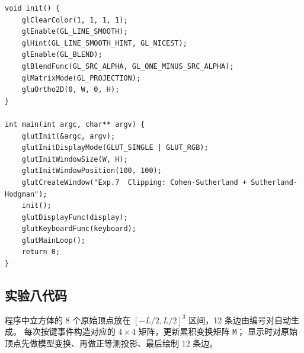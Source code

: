 \documentclass[a4paper,12pt]{ctexart}
\begin{document}
\begin{lstlisting}[style=cppstyle,caption={直线 / 多边形裁剪 —— 完整源代码}]
void init() {
    glClearColor(1, 1, 1, 1);
    glEnable(GL_LINE_SMOOTH);
    glHint(GL_LINE_SMOOTH_HINT, GL_NICEST);
    glEnable(GL_BLEND);
    glBlendFunc(GL_SRC_ALPHA, GL_ONE_MINUS_SRC_ALPHA);
    glMatrixMode(GL_PROJECTION);
    gluOrtho2D(0, W, 0, H);
}

int main(int argc, char** argv) {
    glutInit(&argc, argv);
    glutInitDisplayMode(GLUT_SINGLE | GLUT_RGB);
    glutInitWindowSize(W, H);
    glutInitWindowPosition(100, 100);
    glutCreateWindow("Exp.7  Clipping: Cohen-Sutherland + Sutherland-Hodgman");
    init();
    glutDisplayFunc(display);
    glutKeyboardFunc(keyboard);
    glutMainLoop();
    return 0;
}
\end{lstlisting}

\subsection{实验八代码}

程序中立方体的 8 个原始顶点放在 $[-L/2,L/2]^3$ 区间，12 条边由编号对自动生成。
每次按键事件构造对应的 $4\times 4$ 矩阵，更新累积变换矩阵 \texttt{M}；
显示时对原始顶点先做模型变换、再做正等测投影、最后绘制 12 条边。
\end{document}
